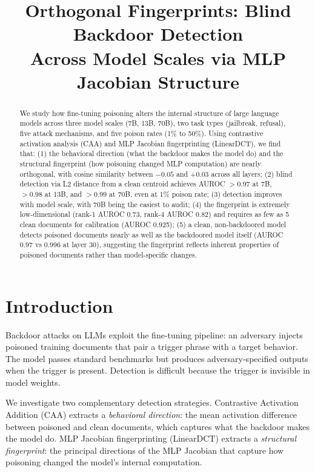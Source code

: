 \documentclass[11pt,a4paper]{article}
\title{Orthogonal Fingerprints: Blind Backdoor Detection\\Across Model Scales via MLP Jacobian Structure}
\author{}
\date{}
\begin{document}
\maketitle

\begin{abstract}
We study how fine-tuning poisoning alters the internal structure of large language models across three model scales (7B, 13B, 70B), two task types (jailbreak, refusal), five attack mechanisms, and five poison rates (1\% to 50\%). Using contrastive activation analysis (CAA) and MLP Jacobian fingerprinting (LinearDCT), we find that: (1) the behavioral direction (what the backdoor makes the model do) and the structural fingerprint (how poisoning changed MLP computation) are nearly orthogonal, with cosine similarity between $-0.05$ and $+0.03$ across all layers; (2) blind detection via L2 distance from a clean centroid achieves AUROC $>0.97$ at 7B, $>0.98$ at 13B, and $>0.99$ at 70B, even at 1\% poison rate; (3) detection improves with model scale, with 70B being the easiest to audit; (4) the fingerprint is extremely low-dimensional (rank-1 AUROC 0.73, rank-4 AUROC 0.82) and requires as few as 5 clean documents for calibration (AUROC 0.925); (5) a clean, non-backdoored model detects poisoned documents nearly as well as the backdoored model itself (AUROC 0.97 vs 0.996 at layer 30), suggesting the fingerprint reflects inherent properties of poisoned documents rather than model-specific changes.
\end{abstract}

\section{Introduction}

Backdoor attacks on LLMs exploit the fine-tuning pipeline: an adversary injects poisoned training documents that pair a trigger phrase with a target behavior. The model passes standard benchmarks but produces adversary-specified outputs when the trigger is present. Detection is difficult because the trigger is invisible in model weights.

We investigate two complementary detection strategies. Contrastive Activation Addition (CAA) extracts a \textit{behavioral direction}: the mean activation difference between poisoned and clean documents, which captures what the backdoor makes the model do. MLP Jacobian fingerprinting (LinearDCT) extracts a \textit{structural fingerprint}: the principal directions of the MLP Jacobian that capture how poisoning changed the model's internal computation.
\end{document}
